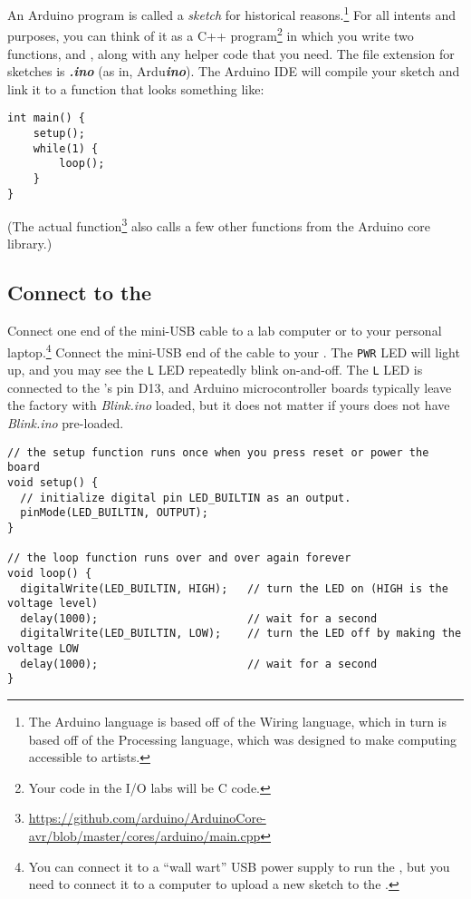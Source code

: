 An Arduino program is called a \textit{sketch} for historical reasons.\footnote{The Arduino language is based off of the Wiring language, which in turn is based off of the Processing language, which was designed to make computing accessible to artists.}
For all intents and purposes, you can think of it as a C++ program\footnote{Your code in the I/O labs will be C code.} in which you write two functions,  and , along with any helper code that you need.
The file extension for sketches is \textbf{\textit{.ino}} (as in, Ardu\textbf{\textit{ino}}).
The Arduino IDE will compile your sketch and link it to a  function that looks something like:
\begin{lstlisting}
int main() {
    setup();
    while(1) {
        loop();
    }
}
\end{lstlisting}
(The actual  function\footnote{\url{https://github.com/arduino/ArduinoCore-avr/blob/master/cores/arduino/main.cpp}} also calls a few other functions from the Arduino core library.)

\subsection{Connect to the \developmentboard}

Connect one end of the mini-USB cable to a lab computer or to your personal laptop.\footnote{You can connect it to a ``wall wart'' USB power supply to run the \developmentboard, but you need to connect it to a computer to upload a new sketch to the \developmentboard.}
Connect the mini-USB end of the cable to your \developmentboard.
The \texttt{PWR} LED will light up, and you may see the \texttt{L} LED repeatedly blink on-and-off.
The \texttt{L} LED is connected to the \developmentboard's pin D13, and Arduino microcontroller boards typically leave the factory with \textit{Blink.ino} loaded, but it does not matter if yours does not have \textit{Blink.ino} pre-loaded.

\begin{lstlisting}[basicstyle=\ttfamily\footnotesize]
// the setup function runs once when you press reset or power the board
void setup() {
  // initialize digital pin LED_BUILTIN as an output.
  pinMode(LED_BUILTIN, OUTPUT);
}

// the loop function runs over and over again forever
void loop() {
  digitalWrite(LED_BUILTIN, HIGH);   // turn the LED on (HIGH is the voltage level)
  delay(1000);                       // wait for a second
  digitalWrite(LED_BUILTIN, LOW);    // turn the LED off by making the voltage LOW
  delay(1000);                       // wait for a second
}
\end{lstlisting}

